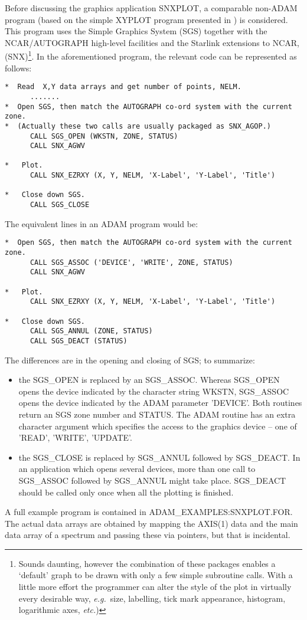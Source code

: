 Before discussing the graphics application SNXPLOT, 
a comparable non-ADAM program
(based on the simple XYPLOT program presented in 
) is considered. 
This program uses the Simple Graphics System (SGS) together with the 
NCAR/AUTOGRAPH high-level facilities and the Starlink extensions to NCAR, 
(SNX)\footnote{Sounds daunting, however the combination of these packages 
enables a `default' graph to be drawn with only a few simple subroutine calls.
With a little more effort the programmer can alter  the style of the plot 
in virtually every desirable way,
{\it e.g.}\ size, labelling, tick mark appearance, histogram, logarithmic 
axes,  {\it etc.})}.
In the aforementioned program, the relevant code can be
represented as follows:
\begin{verbatim}
*  Read  X,Y data arrays and get number of points, NELM.
      .......
*  Open SGS, then match the AUTOGRAPH co-ord system with the current zone.
*  (Actually these two calls are usually packaged as SNX_AGOP.)
      CALL SGS_OPEN (WKSTN, ZONE, STATUS)
      CALL SNX_AGWV

*   Plot.
      CALL SNX_EZRXY (X, Y, NELM, 'X-Label', 'Y-Label', 'Title')

*   Close down SGS.
      CALL SGS_CLOSE
\end{verbatim}
The equivalent lines in an ADAM program would be:
\begin{verbatim}
*  Open SGS, then match the AUTOGRAPH co-ord system with the current zone.
      CALL SGS_ASSOC ('DEVICE', 'WRITE', ZONE, STATUS)      
      CALL SNX_AGWV

*   Plot.
      CALL SNX_EZRXY (X, Y, NELM, 'X-Label', 'Y-Label', 'Title')

*   Close down SGS.
      CALL SGS_ANNUL (ZONE, STATUS)
      CALL SGS_DEACT (STATUS)
\end{verbatim}
The differences are in the opening and closing of SGS; to summarize:
\begin{itemize}
\item the SGS\_OPEN is replaced by an SGS\_ASSOC.
Whereas SGS\_OPEN opens the device indicated by the character string WKSTN,
SGS\_ASSOC opens the device indicated by the ADAM parameter 'DEVICE'.
Both routines return an SGS zone number and STATUS. The ADAM routine has an 
extra character argument which specifies the access to the graphics device 
-- one of 'READ', 'WRITE', 'UPDATE'.
\item the SGS\_CLOSE is replaced by SGS\_ANNUL followed by SGS\_DEACT.
In an application which opens several devices, more than 
one call to SGS\_ASSOC followed by SGS\_ANNUL might take place.
SGS\_DEACT should be called only once when all the
plotting is finished.
\end{itemize}
A full example program is contained in ADAM\_EXAMPLES:SNXPLOT.FOR.
The actual data arrays are obtained by mapping the AXIS(1) data and the 
main data array of a spectrum and passing these via  pointers,
but that is incidental.


